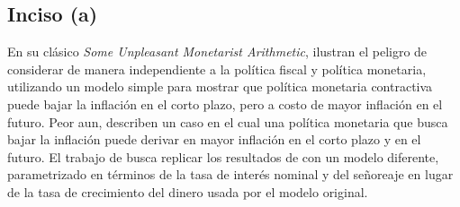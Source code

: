 \documentclass[../../entrega.tex]{subfiles}
\begin{document}
\subsection{Inciso (a)}
En su clásico \emph{Some Unpleasant Monetarist Arithmetic}, \textcite{sargent_unpleasant_1981} ilustran el peligro de considerar de manera independiente a la política fiscal y política monetaria, utilizando un modelo simple para mostrar que política monetaria contractiva puede bajar la inflación en el corto plazo, pero a costo de mayor inflación en el futuro.
Peor aun, describen un caso en el cual una política monetaria que busca bajar la inflación puede derivar en mayor inflación en el corto plazo y en el futuro.
El trabajo de \textcite{werning_recalculating_2024} busca replicar los resultados de \textcite{sargent_unpleasant_1981} con un modelo diferente, parametrizado en términos de la tasa de interés nominal y del señoreaje en lugar de la tasa de crecimiento del dinero usada por el modelo original.

\end{document}
